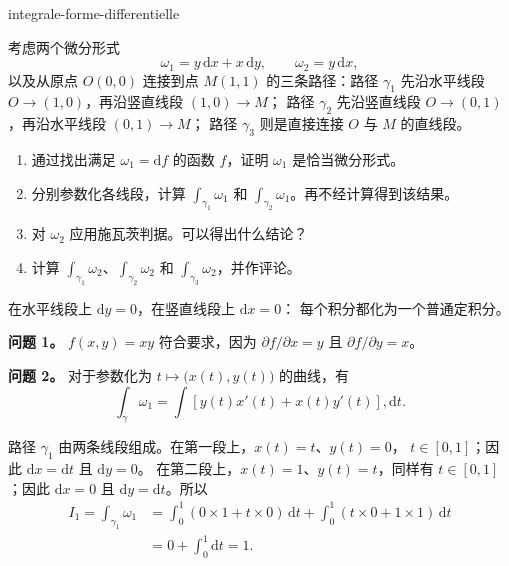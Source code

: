
\begin{exo}[沿路径积分微分形式]{integrale-forme-differentielle}

考虑两个微分形式
\[
\omega_1 = y\,\mathrm{d}x + x\,\mathrm{d}y,
\qquad
\omega_2 = y\,\mathrm{d}x,
\]
以及从原点 $O(0,0)$ 连接到点 $M(1,1)$ 的三条路径：路径
$\gamma_1$ 先沿水平线段 $O\to(1,0)$，再沿竖直线段 $(1,0)\to M$；
路径 $\gamma_2$ 先沿竖直线段 $O\to(0,1)$，再沿水平线段 $(0,1)\to M$；
路径 $\gamma_3$ 则是直接连接 $O$ 与 $M$ 的直线段。

\begin{enumerate}
\item 通过找出满足 $\omega_1 = \mathrm{d}f$ 的函数 $f$，证明 $\omega_1$ 是恰当微分形式。
\item 分别参数化各线段，计算 $\int_{\gamma_1}\omega_1$ 和 $\int_{\gamma_2}\omega_1$。再不经计算得到该结果。
\item 对 $\omega_2$ 应用施瓦茨判据。可以得出什么结论？
\item 计算 $\int_{\gamma_1}\omega_2$、$\int_{\gamma_2}\omega_2$ 和 $\int_{\gamma_3}\omega_2$，并作评论。
\end{enumerate}

\begin{indication}
在水平线段上 $\mathrm{d}y = 0$，在竖直线段上 $\mathrm{d}x = 0$：
每个积分都化为一个普通定积分。
\end{indication}

\begin{solution}
\textbf{问题 1。} $f(x,y) = xy$ 符合要求，因为 $\partial f/\partial x = y$ 且 $\partial f/\partial y = x$。

\textbf{问题 2。} 对于参数化为 $t\mapsto\bigl(x(t),y(t)\bigr)$ 的曲线，有
\[
\int_\gamma\omega_1
= \int \left[y(t)x'(t)+x(t)y'(t)\right],\mathrm{d}t.
\]

路径 $\gamma_1$ 由两条线段组成。在第一段上，$x(t)=t$、$y(t)=0$，
$t\in[0,1]$；因此 $\mathrm{d}x=\mathrm{d}t$ 且 $\mathrm{d}y=0$。
在第二段上，$x(t)=1$、$y(t)=t$，同样有 $t\in[0,1]$；因此
$\mathrm{d}x=0$ 且 $\mathrm{d}y=\mathrm{d}t$。所以
\[
\begin{aligned}
I_1
= \int_{\gamma_1}\omega_1
&= \int_0^1\left(0\times 1+t\times 0\right)\,\mathrm{d}t
 + \int_0^1\left(t\times 0+1\times 1\right)\,\mathrm{d}t \\
&= 0+\int_0^1\mathrm{d}t = 1.
\end{aligned}
\]


\end{solution}
\end{exo}
